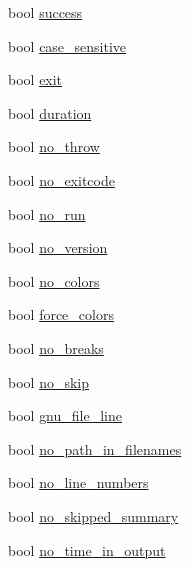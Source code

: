 \begin{DoxyCompactItemize}
\item 
bool \mbox{\hyperlink{structdoctest_1_1_context_options_a5c7bc4cf57fadf73e626666a0a548b92}{success}}
\item 
bool \mbox{\hyperlink{structdoctest_1_1_context_options_a08571475229452c2eb933da314a74dff}{case\+\_\+sensitive}}
\item 
bool \mbox{\hyperlink{structdoctest_1_1_context_options_a85d785559ea88e0bd61890f77f00a82f}{exit}}
\item 
bool \mbox{\hyperlink{structdoctest_1_1_context_options_a0fc3e0c1cf669cffd1f826c005fc4223}{duration}}
\item 
bool \mbox{\hyperlink{structdoctest_1_1_context_options_a642d847a76880d946bdd62b35eba3f63}{no\+\_\+throw}}
\item 
bool \mbox{\hyperlink{structdoctest_1_1_context_options_adcbcab2df10d87307a4754ac9588d35f}{no\+\_\+exitcode}}
\item 
bool \mbox{\hyperlink{structdoctest_1_1_context_options_aad35f517c65f792ddc72a672d9014222}{no\+\_\+run}}
\item 
bool \mbox{\hyperlink{structdoctest_1_1_context_options_ad7371979d5134b109dd00fba771b0271}{no\+\_\+version}}
\item 
bool \mbox{\hyperlink{structdoctest_1_1_context_options_a4fc9b6673b818b8cb5969725f16b59c3}{no\+\_\+colors}}
\item 
bool \mbox{\hyperlink{structdoctest_1_1_context_options_a8cd276e86a209f3d5486eb6c5a2a29bf}{force\+\_\+colors}}
\item 
bool \mbox{\hyperlink{structdoctest_1_1_context_options_af82a6fc802b8ed33a84ea96e85b0d911}{no\+\_\+breaks}}
\item 
bool \mbox{\hyperlink{structdoctest_1_1_context_options_a56344ffa781ee4da6cbf3f6c11da8564}{no\+\_\+skip}}
\item 
bool \mbox{\hyperlink{structdoctest_1_1_context_options_aab894e731a6fc86cf095288ec7d0c0f2}{gnu\+\_\+file\+\_\+line}}
\item 
bool \mbox{\hyperlink{structdoctest_1_1_context_options_a1e9a8bf8feba5cfe25558e5977c4bd7c}{no\+\_\+path\+\_\+in\+\_\+filenames}}
\item 
bool \mbox{\hyperlink{structdoctest_1_1_context_options_a880207c3b4cc98fc5c8d94998841e837}{no\+\_\+line\+\_\+numbers}}
\item 
bool \mbox{\hyperlink{structdoctest_1_1_context_options_a4e22eec59e63ed4ff6ab4dfce2389c99}{no\+\_\+skipped\+\_\+summary}}
\item 
bool \mbox{\hyperlink{structdoctest_1_1_context_options_a7932d4aa0f360efec8cc201ec63c8366}{no\+\_\+time\+\_\+in\+\_\+output}}

\end{DoxyCompactItemize}
